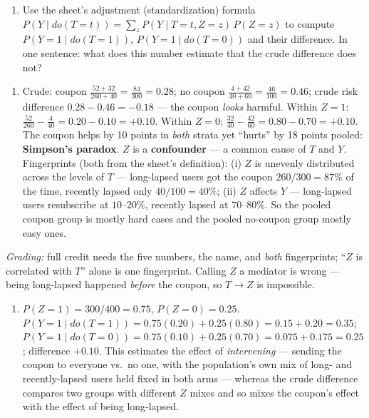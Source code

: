 \documentclass[
  11pt,
]{article}
\providecommand{\tightlist}{%
  \setlength{\itemsep}{0pt}\setlength{\parskip}{0pt}}
\begin{document}
\begin{enumerate}
\def\labelenumi{(\alph{enumi})}
\setcounter{enumi}{1}
\tightlist
\item
  Use the sheet's adjustment (standardization) formula
  \(P(Y\mid do(T{=}t)) = \sum_z P(Y\mid T{=}t, Z{=}z)\,P(Z{=}z)\) to
  compute \(P(Y{=}1\mid do(T{=}1))\), \(P(Y{=}1\mid do(T{=}0))\) and
  their difference. In one sentence: what does this number estimate that
  the crude difference does not?
\end{enumerate}

\begin{solutionbox}

\begin{enumerate}
\def\labelenumi{(\alph{enumi})}
\tightlist
\item
  Crude: coupon \(\frac{52+32}{260+40} = \frac{84}{300} = 0.28\); no
  coupon \(\frac{4+42}{40+60} = \frac{46}{100} = 0.46\); crude risk
  difference \(0.28-0.46 = \mathbf{-0.18}\) --- the coupon \emph{looks}
  harmful. Within \(Z{=}1\):
  \(\frac{52}{260}-\frac{4}{40} = 0.20-0.10 = \mathbf{+0.10}\). Within
  \(Z{=}0\):
  \(\frac{32}{40}-\frac{42}{60} = 0.80-0.70 = \mathbf{+0.10}\). The
  coupon helps by 10 points in \emph{both} strata yet ``hurts'' by 18
  points pooled: \textbf{Simpson's paradox}. \(Z\) is a
  \textbf{confounder} --- a common cause of \(T\) and \(Y\).
  Fingerprints (both from the sheet's definition): (i) \(Z\) is unevenly
  distributed across the levels of \(T\) --- long-lapsed users got the
  coupon \(260/300 = 87\%\) of the time, recently lapsed only
  \(40/100 = 40\%\); (ii) \(Z\) affects \(Y\) --- long-lapsed users
  resubscribe at \(10\)--\(20\%\), recently lapsed at \(70\)--\(80\%\).
  So the pooled coupon group is mostly hard cases and the pooled
  no-coupon group mostly easy ones.
\end{enumerate}

\emph{Grading:} full credit needs the five numbers, the name, and
\emph{both} fingerprints; ``\(Z\) is correlated with \(T\)'' alone is
one fingerprint. Calling \(Z\) a mediator is wrong --- being long-lapsed
happened \emph{before} the coupon, so \(T\to Z\) is impossible.

\begin{enumerate}
\def\labelenumi{(\alph{enumi})}
\setcounter{enumi}{1}
\tightlist
\item
  \(P(Z{=}1) = 300/400 = 0.75\), \(P(Z{=}0) = 0.25\).
  \(P(Y{=}1\mid do(T{=}1)) = 0.75(0.20)+0.25(0.80) = 0.15+0.20 = \mathbf{0.35}\);
  \(P(Y{=}1\mid do(T{=}0)) = 0.75(0.10)+0.25(0.70) = 0.075+0.175 = \mathbf{0.25}\);
  difference \(\mathbf{+0.10}\). This estimates the effect of
  \emph{intervening} --- sending the coupon to everyone vs.~no one, with
  the population's own mix of long- and recently-lapsed users held fixed
  in both arms --- whereas the crude difference compares two groups with
  different \(Z\) mixes and so mixes the coupon's effect with the effect
  of being long-lapsed.
\end{enumerate}


\end{solutionbox}
\end{document}
